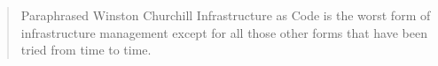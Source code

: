 \begin{quote}{Paraphrased Winston Churchill}
Infrastructure as Code is the worst form of infrastructure management except for all those other forms that have been tried from time to time.
\end{quote}

